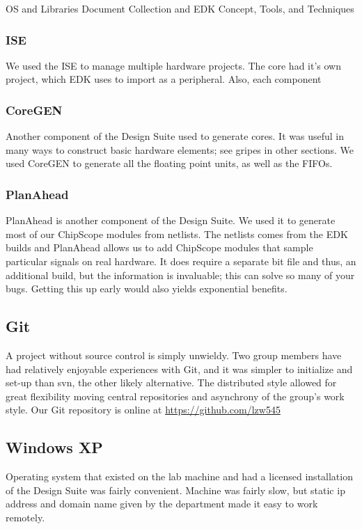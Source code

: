 \documentclass[letterpaper,10pt]{article}
\begin{document}
OS and Libraries Document Collection and EDK Concept, Tools, and Techniques

\subsubsection{ISE}
We used the ISE to manage multiple hardware projects.  The core had it's own project, which EDK uses to import as a peripheral.  Also, each component 

\subsubsection{CoreGEN}
Another component of the Design Suite used to generate cores.  It was useful in many ways to construct basic hardware elements; see gripes in other sections. We used CoreGEN to generate all the floating point units, as well as the FIFOs.

\subsubsection{PlanAhead}
PlanAhead is another component of the Design Suite.  We used it to generate most of our ChipScope modules from netlists.  The netlists comes from the EDK builds and PlanAhead allows us to add ChipScope modules that sample particular signals on real hardware.  It does require a separate bit file and thus, an additional build, but the information is invaluable; this can solve so many of your bugs.  Getting this up early would also yields exponential benefits.

\subsection{Git}
A project without source control is simply unwieldy.  Two group members have had relatively enjoyable experiences with Git, and it was simpler to initialize and set-up than svn, the other likely alternative.  The distributed style allowed for great flexibility moving central repositories and asynchrony of the group's work style. Our Git repository is online at \url{https://github.com/lzw545}

\subsection{Windows XP}
Operating system that existed on the lab machine and had a licensed installation of the Design Suite was fairly convenient.  Machine was fairly slow, but static ip address and domain name given by the department made it easy to work remotely.
\end{document}
